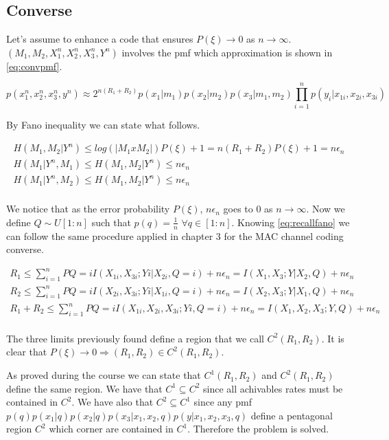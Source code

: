 \subsection{Converse}

Let's assume to enhance a code that ensures $P(\xi) \rightarrow 0$ as $n \rightarrow \infty$. $(M_1,M_2,X_1^n,X_2^n,X_3^n,Y^n)$ involves the pmf which approximation is shown in \eqref{eq:convpmf}.

\begin{equation}
	p(x_1^n,x_2^n,x_3^n,y^n)\approx2^{n(R_1+R_2)}p(x_1|m_1)p(x_2|m_2)p(x_3|m_1,m_2)\prod_{i=1}^n p(y_i|x_{1i},x_{2i},x_{3i})
	\label{eq:convpmf}
\end{equation}

By Fano inequality we can state what follows.

\begin{equation}
	\begin{gathered}
		H(M_1,M_2|Y^n) \leq log(|M_1xM_2|)P(\xi)+1 = n(R_1+R_2)P(\xi)+1 = n\epsilon_n\\
		H(M_1|Y^n,M_1) \leq H(M_1,M_2|Y^n) \leq n\epsilon_n \\
		H(M_1|Y^n,M_2) \leq H(M_1,M_2|Y^n) \leq n\epsilon_n\\
	\end{gathered}
	\label{eq:recallfano}
\end{equation}

We notice that as the error probability $P(\xi)$, $n\epsilon_n$ goes to $0$ as $n \rightarrow \infty$. Now we define $Q \sim U[1:n]$ such that $p(q)=\frac{1}{n}$ $\forall q \in [1:n]$. Knowing \eqref{eq:recallfano} we can follow the same procedure applied in chapter 3 for the MAC channel coding converse.

\begin{equation}
	\begin{gathered}
		R_1 \leq \sum_{i=1}^n P{Q=i} I(X_{1i},X_{3i};Yi|X_{2i},Q=i) + n\epsilon_n = I(X_{1},X_{3};Y|X_{2},Q)+n\epsilon_n\\
		R_2 \leq \sum_{i=1}^n P{Q=i} I(X_{2i},X_{3i};Yi|X_{1i}, Q=i) + n\epsilon_n = I(X_{2},X_{3};Y|X_{1},Q)+n\epsilon_n\\
		R_1 + R_2 \leq \sum_{i=1}^n P{Q=i}I(X_{1i},X_{2i},X_{3i};Yi, Q=i) + n\epsilon_n = I(X_{1},X_{2},X_{3};Y,Q)+n\epsilon_n \\
	\end{gathered}
\end{equation}

The three limits previously found define a region that we call $C^2(R_1,R_2)$. It is clear that $ P(\xi) \rightarrow 0 \Rightarrow (R_1,R_2) \in C^2(R_1, R_2)$.

As proved during the course we can state that $C^1(R_1,R_2)$ and $C^2(R_1,R_2)$ define the same region. We have that $C^1 \subseteq C^2$ since all achivables rates must be contained in $C^2$. We have also that $C^2 \subseteq C^1$ since any pmf $p(q)p(x_1|q)p(x_2|q)p(x_3|x_1,x_2,q)p(y|x_1,x_2,x_3,q)$ define a pentagonal region $C^2$ which corner are contained in $C^1$. Therefore the problem is solved.
